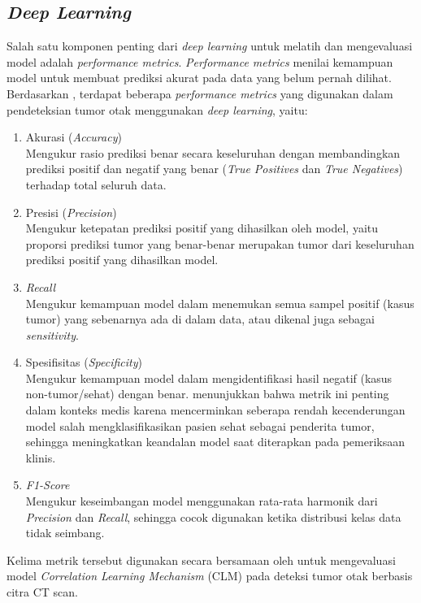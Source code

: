 \subsection{\textit{Deep Learning}}
\label{sec:Deep Learning}
Salah satu komponen penting dari \textit{deep learning} untuk melatih dan mengevaluasi model adalah \textit{performance metrics}. \textit{Performance metrics} menilai kemampuan model untuk membuat prediksi akurat pada data yang belum pernah dilihat. Berdasarkan \textcite{wozniak2021deep}, terdapat beberapa \textit{performance metrics} yang digunakan dalam pendeteksian tumor otak menggunakan \textit{deep learning}, yaitu:
\begin{enumerate}
	\item Akurasi (\textit{Accuracy}) \\
	Mengukur rasio prediksi benar secara keseluruhan dengan membandingkan prediksi positif dan negatif yang benar (\textit{True Positives} dan \textit{True Negatives}) terhadap total seluruh data.
	\item Presisi (\textit{Precision}) \\
	Mengukur ketepatan prediksi positif yang dihasilkan oleh model, yaitu proporsi prediksi tumor yang benar-benar merupakan tumor dari keseluruhan prediksi positif yang dihasilkan model.
	\item \textit{Recall} \\
	Mengukur kemampuan model dalam menemukan semua sampel positif (kasus tumor) yang sebenarnya ada di dalam data, atau dikenal juga sebagai \textit{sensitivity}.
	\item Spesifisitas (\textit{Specificity}) \\
	Mengukur kemampuan model dalam mengidentifikasi hasil negatif (kasus non-tumor/sehat) dengan benar. \textcite{wozniak2021deep} menunjukkan bahwa metrik ini penting dalam konteks medis karena mencerminkan seberapa rendah kecenderungan model salah mengklasifikasikan pasien sehat sebagai penderita tumor, sehingga meningkatkan keandalan model saat diterapkan pada pemeriksaan klinis.
	\item \textit{F1-Score} \\
	Mengukur keseimbangan model menggunakan rata-rata harmonik dari \textit{Precision} dan \textit{Recall}, sehingga cocok digunakan ketika distribusi kelas data tidak seimbang.
\end{enumerate}

Kelima metrik tersebut digunakan secara bersamaan oleh \textcite{wozniak2021deep} untuk mengevaluasi model \textit{Correlation Learning Mechanism} (CLM) pada deteksi tumor otak berbasis citra CT scan.

